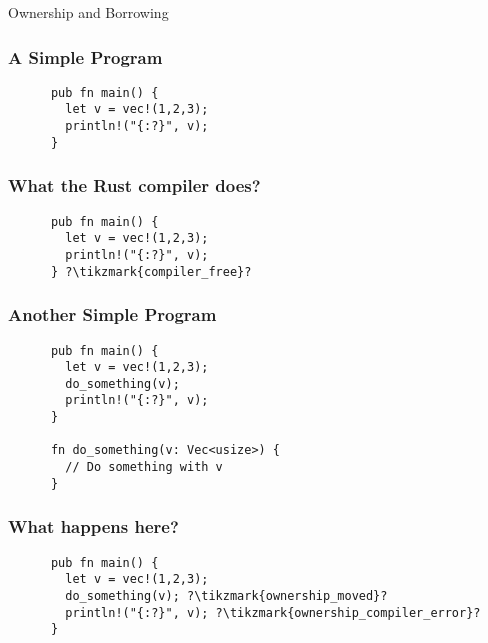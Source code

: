 \begin{section}{Ownership and Borrowing}
  \begin{frame}[fragile]
    \frametitle{A Simple Program}
    \begin{verbatim}
      pub fn main() {
        let v = vec!(1,2,3);
        println!("{:?}", v);
      }
    \end{verbatim}
  \end{frame}

  \begin{frame}[fragile]
    \frametitle{What the Rust compiler does?}
    \begin{verbatim}
      pub fn main() {
        let v = vec!(1,2,3);
        println!("{:?}", v);
      } ?\tikzmark{compiler_free}?
    \end{verbatim}
  \end{frame}

  \begin{frame}[fragile]
    \frametitle{Another Simple Program}
    \begin{verbatim}
      pub fn main() {
        let v = vec!(1,2,3);
        do_something(v);
        println!("{:?}", v);
      }

      fn do_something(v: Vec<usize>) {
        // Do something with v
      }
    \end{verbatim}
  \end{frame}

  \begin{frame}[fragile]
    \frametitle{What happens here?}
    \begin{verbatim}
      pub fn main() {
        let v = vec!(1,2,3);
        do_something(v); ?\tikzmark{ownership_moved}?
        println!("{:?}", v); ?\tikzmark{ownership_compiler_error}?
      }


\end{verbatim}
\end{frame}
\end{section}
